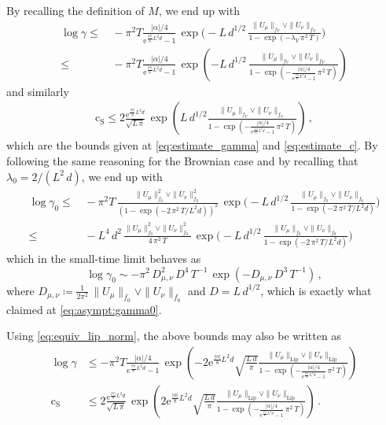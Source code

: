 \documentclass[final,12pt]{colt2023} %
\newcommand{\bes}{\begin{equation}}
\newcommand{\ees}{\end{equation}}
\newcommand{\rme}{\mathrm{e}}
\def\cconst{\mathrm{c}_{\mathrm{S}}}
\begin{document}
By recalling the definition of $M$, we end up with
\bes
\begin{aligned}
\log\gamma\leq&\, -\pi^2 T\frac{|\alpha|/4}{\rme^{\frac{|\alpha|}{8}L^2d}-1}\,\exp\biggl(-L\,d^{1/2}\,\frac{ \|U_{\mu}\|_{f_V}\vee\|U_{\nu}\|_{f_V}}{1-\exp(-\lambda_V \,\pi^2\,T)}\biggr)\\
\leq&\, -\pi^2 T\frac{|\alpha|/4}{\rme^{\frac{|\alpha|}{8}L^2d}-1}\,\exp\left(-L\,d^{1/2}\,\frac{ \|U_{\mu}\|_{f_V}\vee\|U_{\nu}\|_{f_V}}{1-\exp\left(-\frac{|\alpha|/{4}}{\rme^{\frac{|\alpha|}{8}L^2d}-1} \,\pi^2\,T\right)}\right)
\end{aligned}
\ees
and similarly
\begin{align}
    \cconst\leq 2\frac{\rme^{\frac{|\alpha|}{8}L^2 d}}{\sqrt{L \, \pi}}\,\exp\left(L\,d^{1/2}\frac{ \|U_{\mu}\|_{f_V}\vee\|U_{\nu}\|_{f_V}}{1-\exp\left(-\frac{|\alpha|/{4}}{\rme^{\frac{|\alpha|}{8}L^2d}-1} \,\pi^2\,T\right)}\right)\,,
\end{align}
which are the bounds given at \eqref{eq:estimate_gamma} and \eqref{eq:estimate_c}. By following the same reasoning for the Brownian case and by recalling that $\lambda_0=2/(L^2\,d)$, we end up with
\bes
\begin{aligned}
\log\gamma_0\leq&\, -\pi^2 T \,\frac{ \|U_{\mu}\|^2_{f_0}\vee\|U_{\nu}\|^2_{f_0}}{(1-\exp(-2\,\pi^2\,T/L^2d))^2}\,\exp\biggl(-L\,d^{1/2}\,\frac{ \|U_{\mu}\|_{f_0}\vee\|U_{\nu}\|_{f_0}}{1-\exp(-2 \,\pi^2\,T/L^2d)}\biggr)\\
\leq&\,- L^4\,d^2\,\frac{ \|U_{\mu}\|^2_{f_0}\vee\|U_{\nu}\|^2_{f_0}}{4\,\pi^2\,T}\,\exp\biggl(-L\,d^{1/2}\,\frac{ \|U_{\mu}\|_{f_0}\vee\|U_{\nu}\|_{f_0}}{1-\exp(-2\,\pi^2\,T/L^2d)}\biggr)
\end{aligned}
\ees
which in the small-time limit behaves as
\bes
\log\gamma_0\sim -\pi^2\,D_{\mu,\nu}^2\,{D^4}\,T^{-1}\,\exp(- D_{\mu,\nu}\,D^3\,T^{-1})\,,
\ees
where $D_{\mu,\nu}\coloneqq \frac{1}{2\pi^2}\,\|U_{\mu}\|_{f_0}\vee\|U_{\nu}\|_{f_0}$ and $D=L\,d^{1/2}$, which is exactly what claimed at \eqref{eq:asympt:gamma0}.

 \medskip

Using \eqref{eq:equiv_lip_norm}, the above bounds may also be written as
\begin{align}
    \log\gamma&\leq -\pi^2 T\frac{|\alpha|/{4}}{\rme^{\frac{|\alpha|}{8}L^2 d}-1}\,\exp\left(-2\rme^{\frac{|\alpha|}{8}L^2 d}\sqrt{\frac{L\,d}{\pi}}\frac{ \|U_{\mu}\|_{\mathrm{Lip}}\vee\|U_{\nu}\|_{\mathrm{Lip}}}{1-\exp\left(-\frac{|\alpha|/{4}}{\rme^{\frac{|\alpha|}{8}L^2d}-1} \,\pi^2\,T\right)}\right)\\
    \cconst& \leq  2\frac{\rme^{\frac{|\alpha|}{8}L^2 d}}{\sqrt{L \, \pi}}\,\exp\left(2\rme^{\frac{|\alpha|}{8}L^2 d}\sqrt{\frac{L\,d}{\pi}}\frac{ \|U_{\mu}\|_{\mathrm{Lip}}\vee\|U_{\nu}\|_{\mathrm{Lip}}}{1-\exp\left(-\frac{|\alpha|/{4}}{\rme^{\frac{|\alpha|}{8}L^2d}-1} \,\pi^2\,T\right)}\right)\,.
\end{align}
\end{document}
